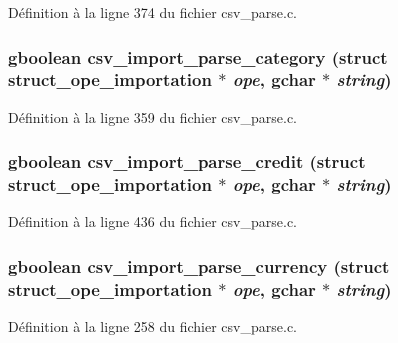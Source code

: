 Définition à la ligne 374 du fichier csv\_\-parse.c.

\subsubsection[{csv\_\-import\_\-parse\_\-category}]{\setlength{\rightskip}{0pt plus 5cm}gboolean csv\_\-import\_\-parse\_\-category (struct {\bf struct\_\-ope\_\-importation} $\ast$ {\em ope}, \/  gchar $\ast$ {\em string})}\label{csv__parse_8c_a46cb8766a736010e02a6450c905d5447}


Définition à la ligne 359 du fichier csv\_\-parse.c.

\subsubsection[{csv\_\-import\_\-parse\_\-credit}]{\setlength{\rightskip}{0pt plus 5cm}gboolean csv\_\-import\_\-parse\_\-credit (struct {\bf struct\_\-ope\_\-importation} $\ast$ {\em ope}, \/  gchar $\ast$ {\em string})}\label{csv__parse_8c_a2ccbce0ca05fb2e453f3155cdeee95ac}


Définition à la ligne 436 du fichier csv\_\-parse.c.

\subsubsection[{csv\_\-import\_\-parse\_\-currency}]{\setlength{\rightskip}{0pt plus 5cm}gboolean csv\_\-import\_\-parse\_\-currency (struct {\bf struct\_\-ope\_\-importation} $\ast$ {\em ope}, \/  gchar $\ast$ {\em string})}\label{csv__parse_8c_acf8c665ebd5dcf808b746ed121036ceb}


Définition à la ligne 258 du fichier csv\_\-parse.c.

